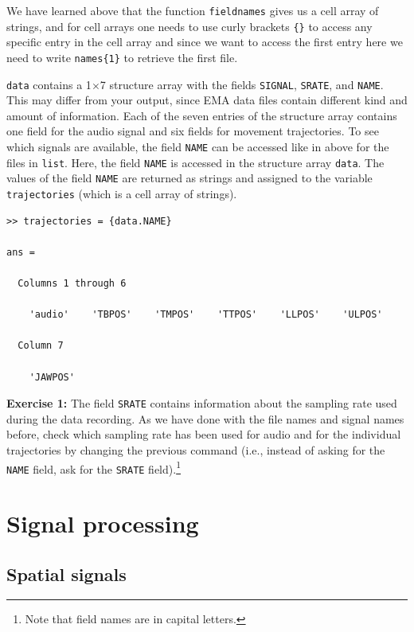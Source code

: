 \documentclass[a4paper, 12pt]{article}
\begin{document}
We have learned above that the function \texttt{fieldnames} gives us a cell array of strings, and for cell arrays one needs to use curly brackets \texttt{\{\}} to access any specific entry in the cell array and since we want to access the first entry here we need to write \texttt{names\{1\}} to retrieve the first file.\par
\texttt{data} contains a 1$\times$7 structure array with the fields \texttt{SIGNAL}, \texttt{SRATE}, and \texttt{NAME}. This may differ from your output, since EMA data files contain different kind and amount of information. Each of the seven entries of the structure array contains one field for the audio signal and six fields for movement trajectories. To see which signals are available, the field \texttt{NAME} can be accessed like in above for the files in \texttt{list}. Here, the field \texttt{NAME} is accessed in the structure array \texttt{data}. The values of the field \texttt{NAME} are returned as strings and assigned to the variable \texttt{trajectories} (which is a cell array of strings).\par

\begin{verbatim}
>> trajectories = {data.NAME} 

ans = 

  Columns 1 through 6

    'audio'    'TBPOS'    'TMPOS'    'TTPOS'    'LLPOS'    'ULPOS'

  Column 7

    'JAWPOS'
\end{verbatim}

\noindent \textbf{Exercise 1:} The field \texttt{SRATE} contains information about the sampling rate used during the data recording. As we have done with the file names and signal names before, check which sampling rate has been used for audio and for the individual trajectories by changing the previous command (i.e., instead of asking for the \texttt{NAME} field, ask for the \texttt{SRATE} field).\footnote{Note that field names are in capital letters.}\par\smallskip

\newpage
\section{Signal processing}
\subsection{Spatial signals}\label{spasig}
\end{document}

